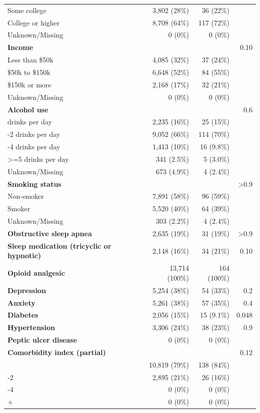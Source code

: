 \documentclass[11pt]{article}
\begin{document}
\begin{longtable}{@{}p{6.4cm}rrr@{}}
\quad Some college & 3,802 (28\%) & 36 (22\%) &  \\
\quad College or higher & 8,708 (64\%) & 117 (72\%) &  \\
\quad Unknown/Missing & 0 (0\%) & 0 (0\%) &  \\
\textbf{Income} &  &  & 0.10 \\
\quad Less than \$50k & 4,085 (32\%) & 37 (24\%) &  \\
\quad \$50k to \$150k & 6,648 (52\%) & 84 (55\%) &  \\
\quad \$150k or more & 2,168 (17\%) & 32 (21\%) &  \\
\quad Unknown/Missing & 0 (0\%) & 0 (0\%) &  \\
\textbf{Alcohol use} &  &  & 0.6 \\
\quad 0 drinks per day & 2,235 (16\%) & 25 (15\%) &  \\
\quad 1-2 drinks per day & 9,052 (66\%) & 114 (70\%) &  \\
\quad 3-4 drinks per day & 1,413 (10\%) & 16 (9.8\%) &  \\
\quad >=5 drinks per day & 341 (2.5\%) & 5 (3.0\%) &  \\
\quad Unknown/Missing & 673 (4.9\%) & 4 (2.4\%) &  \\
\textbf{Smoking status} &  &  & >0.9 \\
\quad Non-smoker & 7,891 (58\%) & 96 (59\%) &  \\
\quad Smoker & 5,520 (40\%) & 64 (39\%) &  \\
\quad Unknown/Missing & 303 (2.2\%) & 4 (2.4\%) &  \\
\textbf{Obstructive sleep apnea} & 2,635 (19\%) & 31 (19\%) & >0.9 \\
\textbf{Sleep medication (tricyclic or hypnotic)} & 2,148 (16\%) & 34 (21\%) & 0.10 \\
\textbf{Opioid analgesic} & 13,714 (100\%) & 164 (100\%) &  \\
\textbf{Depression} & 5,254 (38\%) & 54 (33\%) & 0.2 \\
\textbf{Anxiety} & 5,261 (38\%) & 57 (35\%) & 0.4 \\
\textbf{Diabetes} & 2,056 (15\%) & 15 (9.1\%) & 0.048 \\
\textbf{Hypertension} & 3,306 (24\%) & 38 (23\%) & 0.9 \\
\textbf{Peptic ulcer disease} & 0 (0\%) & 0 (0\%) &  \\
\textbf{Comorbidity index (partial)} &  &  & 0.12 \\
\quad 0 & 10,819 (79\%) & 138 (84\%) &  \\
\quad 1-2 & 2,895 (21\%) & 26 (16\%) &  \\
\quad 3-4 & 0 (0\%) & 0 (0\%) &  \\
\quad 5+ & 0 (0\%) & 0 (0\%) &  \\
\bottomrule \end{longtable}\normalsize
\end{document}
